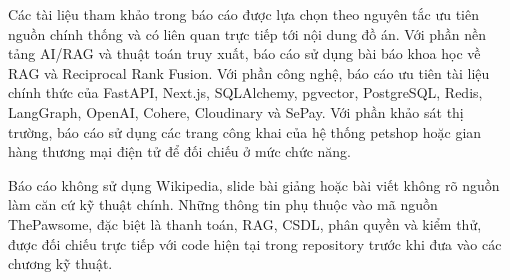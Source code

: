 \documentclass[../DoAn.tex]{subfiles}
\begin{document}
Các tài liệu tham khảo trong báo cáo được lựa chọn theo nguyên tắc ưu tiên nguồn chính thống và có liên quan trực tiếp tới nội dung đồ án. Với phần nền tảng AI/RAG và thuật toán truy xuất, báo cáo sử dụng bài báo khoa học về RAG và Reciprocal Rank Fusion. Với phần công nghệ, báo cáo ưu tiên tài liệu chính thức của FastAPI, Next.js, SQLAlchemy, pgvector, PostgreSQL, Redis, LangGraph, OpenAI, Cohere, Cloudinary và SePay. Với phần khảo sát thị trường, báo cáo sử dụng các trang công khai của hệ thống petshop hoặc gian hàng thương mại điện tử để đối chiếu ở mức chức năng.

Báo cáo không sử dụng Wikipedia, slide bài giảng hoặc bài viết không rõ nguồn làm căn cứ kỹ thuật chính. Những thông tin phụ thuộc vào mã nguồn ThePawsome, đặc biệt là thanh toán, RAG, CSDL, phân quyền và kiểm thử, được đối chiếu trực tiếp với code hiện tại trong repository trước khi đưa vào các chương kỹ thuật.
\end{document}
